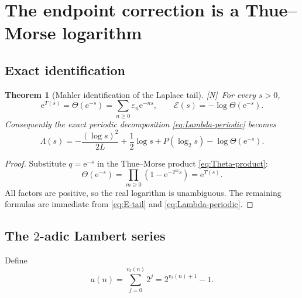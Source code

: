 \documentclass[11pt,oneside]{article}
\newtheorem{theorem}{Theorem}[section]
\theoremstyle{definition}
\theoremstyle{remark}
\newcommand{\e}{\mathrm e}
\newcommand{\vtwo}{v_2}
\newcommand{\statusN}{\textsf{[N]}}
\begin{document}
\section{The endpoint correction is a Thue--Morse logarithm}
\label{sec:endpoint-TM}

\subsection{Exact identification}

\begin{theorem}[Mahler identification of the Laplace tail]\label{thm:tail-TM}
\statusN\ For every $s>0$,
\begin{equation}
 \boxed{
 \e^{T(s)}=\Theta(\e^{-s})
 =\sum_{n\ge0}\varepsilon_n\e^{-ns},
 \qquad
 \mathcal E(s)=-\log\Theta(\e^{-s}).}                      \label{eq:tail-TM}
\end{equation}
Consequently the exact periodic decomposition \eqref{eq:Lambda-periodic} becomes
\begin{equation}
 \boxed{
 \Lambda(s)=-\frac{(\log s)^2}{2L}+\frac12\log s
 +P(\log_2s)-\log\Theta(\e^{-s}).}                         \label{eq:Lambda-TM}
\end{equation}
\end{theorem}

\begin{proof}
Substitute $q=\e^{-s}$ in the Thue--Morse product \eqref{eq:Theta-product}:
\[
 \Theta(\e^{-s})=\prod_{m\ge0}(1-\e^{-2^ms})=\e^{T(s)}.
\]
All factors are positive, so the real logarithm is unambiguous.  The remaining formulas are
immediate from \eqref{eq:E-tail} and \eqref{eq:Lambda-periodic}.
\end{proof}

\subsection{The $2$-adic Lambert series}
Define
\begin{equation}
 a(n)=\sum_{j=0}^{\vtwo(n)}2^j=2^{\vtwo(n)+1}-1.           \label{eq:a-n}
\end{equation}
\end{document}
